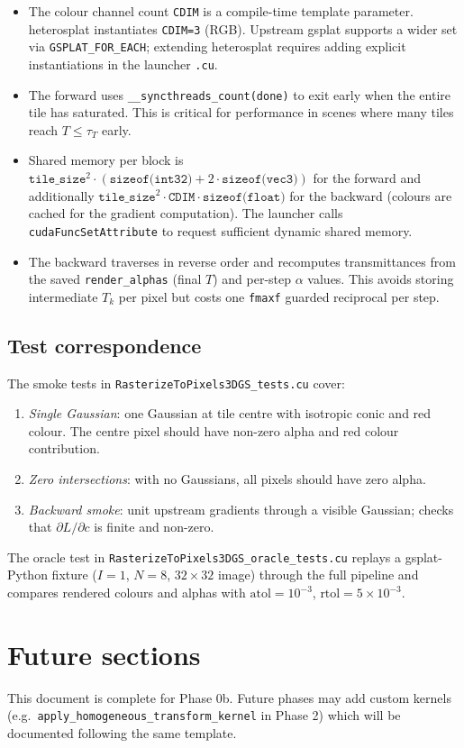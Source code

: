 \documentclass[11pt]{article}
\begin{document}
\begin{itemize}
  \item The colour channel count \texttt{CDIM} is a compile-time
  template parameter. heterosplat instantiates \texttt{CDIM=3} (RGB).
  Upstream gsplat supports a wider set via
  \texttt{GSPLAT\_FOR\_EACH}; extending heterosplat requires adding
  explicit instantiations in the launcher \texttt{.cu}.
  \item The forward uses \texttt{\_\_syncthreads\_count(done)} to
  exit early when the entire tile has saturated. This is critical
  for performance in scenes where many tiles reach
  $T \le \tau_T$ early.
  \item Shared memory per block is
  $\texttt{tile\_size}^2 \cdot (\texttt{sizeof(int32)} +
  2 \cdot \texttt{sizeof(vec3)})$ for the forward and additionally
  $\texttt{tile\_size}^2 \cdot \texttt{CDIM} \cdot
  \texttt{sizeof(float)}$ for the backward (colours are cached for
  the gradient computation). The launcher calls
  \texttt{cudaFuncSetAttribute} to request sufficient dynamic shared
  memory.
  \item The backward traverses in reverse order and recomputes
  transmittances from the saved \texttt{render\_alphas} (final $T$)
  and per-step $\alpha$ values. This avoids storing intermediate
  $T_k$ per pixel but costs one \texttt{fmaxf} guarded reciprocal
  per step.
\end{itemize}

\subsection{Test correspondence}

The smoke tests in \texttt{RasterizeToPixels3DGS\_tests.cu} cover:
\begin{enumerate}
  \item \emph{Single Gaussian}: one Gaussian at tile centre with
  isotropic conic and red colour. The centre pixel should have
  non-zero alpha and red colour contribution.
  \item \emph{Zero intersections}: with no Gaussians, all pixels
  should have zero alpha.
  \item \emph{Backward smoke}: unit upstream gradients through a
  visible Gaussian; checks that $\partial L / \partial c$ is finite
  and non-zero.
\end{enumerate}
The oracle test in \texttt{RasterizeToPixels3DGS\_oracle\_tests.cu}
replays a gsplat-Python fixture ($I=1$, $N=8$, $32 \times 32$
image) through the full pipeline and compares rendered colours and
alphas with $\text{atol} = 10^{-3}$, $\text{rtol} = 5 \times 10^{-3}$.

\section{Future sections}

This document is complete for Phase 0b. Future phases may add custom
kernels (e.g.\ \texttt{apply\_homogeneous\_transform\_kernel} in
Phase 2) which will be documented following the same template.
\end{document}
